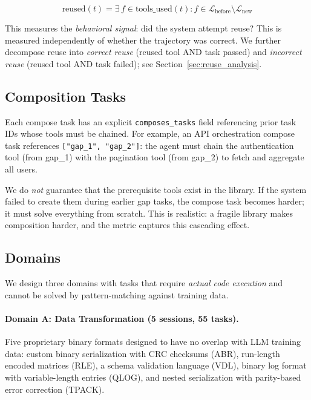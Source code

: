 \documentclass[sigconf,anonymous,review,natbib=false]{acmart}
\begin{document}
\begin{equation}
\text{reused}(t) = \exists\, f \in \text{tools\_used}(t) : f \in \mathcal{L}_{\text{before}} \setminus \mathcal{L}_{\text{new}}
\end{equation}

This measures the \emph{behavioral signal}: did the system attempt reuse? This is measured independently of whether the trajectory was correct. We further decompose reuse into \emph{correct reuse} (reused tool AND task passed) and \emph{incorrect reuse} (reused tool AND task failed); see Section~\ref{sec:reuse_analysis}.

\subsection{Composition Tasks}
\label{sec:compose}

Each compose task has an explicit \texttt{composes\_tasks} field referencing prior task IDs whose tools must be chained. For example, an API orchestration compose task references \texttt{["gap\_1", "gap\_2"]}: the agent must chain the authentication tool (from gap\_1) with the pagination tool (from gap\_2) to fetch and aggregate all users.

We do \emph{not} guarantee that the prerequisite tools exist in the library. If the system failed to create them during earlier gap tasks, the compose task becomes harder; it must solve everything from scratch. This is realistic: a fragile library makes composition harder, and the metric captures this cascading effect.

\subsection{Domains}
\label{sec:domains}

We design three domains with tasks that require \emph{actual code execution} and cannot be solved by pattern-matching against training data.

\paragraph{Domain A: Data Transformation (5 sessions, 55 tasks).} Five proprietary binary formats designed to have no overlap with LLM training data: custom binary serialization with CRC checksums (ABR), run-length encoded matrices (RLE), a schema validation language (VDL), binary log format with variable-length entries (QLOG), and nested serialization with parity-based error correction (TPACK).
\end{document}
